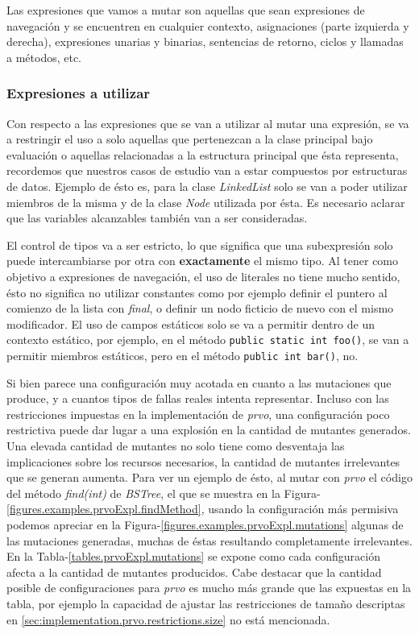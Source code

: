 Las expresiones que vamos a mutar son aquellas que sean expresiones de navegaci\'on y se encuentren en cualquier contexto, asignaciones (parte izquierda y derecha), expresiones unarias y binarias, sentencias de retorno, ciclos y llamadas a m\'etodos, etc.

\subsubsection{Expresiones a utilizar}

Con respecto a las expresiones que se van a utilizar al mutar una expresi\'on, se va a restringir el uso a solo aquellas que pertenezcan a la clase principal bajo evaluaci\'on o aquellas relacionadas a la estructura principal que \'esta representa, recordemos que nuestros casos de estudio van a estar compuestos por estructuras de datos. Ejemplo de \'esto es, para la clase \emph{LinkedList} solo se van a poder utilizar miembros de la misma y de la clase \emph{Node} utilizada por \'esta. Es necesario aclarar que las variables alcanzables tambi\'en van a ser consideradas.

El control de tipos va a ser estricto, lo que significa que una subexpresi\'on solo puede intercambiarse por otra con \textbf{exactamente} el mismo tipo. Al tener como objetivo a expresiones de navegaci\'on, el uso de literales no tiene mucho sentido, \'esto no significa no utilizar constantes como por ejemplo definir el puntero al comienzo de la lista con \emph{final}, o definir un nodo ficticio de nuevo con el mismo modificador. El uso de campos est\'aticos solo se va a permitir dentro de un contexto est\'atico, por ejemplo, en el m\'etodo \lstinline|public static int foo()|, se van a permitir miembros est\'aticos, pero en el m\'etodo \lstinline|public int bar()|, no.

Si bien parece una configuraci\'on muy acotada en cuanto a las mutaciones que produce, y a cuantos tipos de fallas reales intenta representar. Incluso con las restricciones impuestas en la implementaci\'on de \emph{prvo}, una configuraci\'on poco restrictiva puede dar lugar a una explosi\'on en la cantidad de mutantes generados. Una elevada cantidad de mutantes no solo tiene como desventaja las implicaciones sobre los recursos necesarios, la cantidad de mutantes irrelevantes que se generan aumenta. Para ver un ejemplo de \'esto, al mutar con \emph{prvo} el c\'odigo del m\'etodo \emph{find(int)} de \emph{BSTree}, el que se muestra en la Figura-\ref{figures.examples.prvoExpl.findMethod}, usando la configuraci\'on m\'as permisiva podemos apreciar en la Figura-\ref{figures.examples.prvoExpl.mutations} algunas de las mutaciones generadas, muchas de \'estas resultando completamente irrelevantes. En la Tabla-\ref{tables.prvoExpl.mutations} se expone como cada configuraci\'on afecta a la cantidad de mutantes producidos. Cabe destacar que la cantidad posible de configuraciones para \emph{prvo} es mucho m\'as grande que las expuestas en la tabla, por ejemplo la capacidad de ajustar las restricciones de tama\~no descriptas en \ref{sec:implementation.prvo.restrictions.size} no est\'a mencionada.

